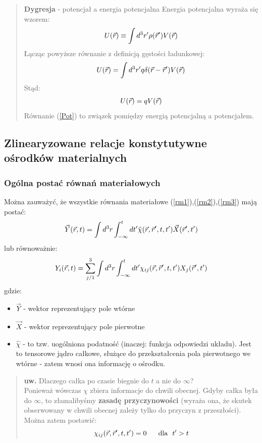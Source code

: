 \begin{enumerate}
\begin{verse}{\textbf{Dygresja} - potencjał a energia potencjalna}
Energia potencjalna wyraża się wzorem:
\begin{equation} U(\vec{r}) \equiv \int d^3r'\rho(\vec{r}')V(\vec{r}) \end{equation}
Łącząc powyższe równanie z definicją gęstości ładunkowej:
\begin{equation} U(\vec{r}) = \int d^3r'q\delta(\vec{r}-\vec{r}')V(\vec{r})\end{equation}
Stąd:
\begin{equation} U(\vec{r}) = qV(\vec{r}) \label{Pot}\end{equation}
Równanie (\ref{Pot}) to związek pomiędzy energią potencjalną a potencjałem.
\end{verse}
\end{enumerate}
\subsection{Zlinearyzowane relacje konstytutywne ośrodków materialnych}
\subsubsection{Ogólna postać równań materiałowych}
Można zauważyć, że wszystkie równania materiałowe (\ref{rm1}),(\ref{rm2}),(\ref{rm3}) mają postać:
\begin{equation} \vec{Y}(\vec{r},t)=\int d^3r \int_{-\infty}^t dt' \hat{\chi}(\vec{r},\vec{r}',t,t') \vec{X}(\vec{r}',t') \end{equation}
lub równoważnie:
\begin{equation} {Y}_i(\vec{r},t)=\sum_{j/1}^3 \int d^3r \int_{-\infty}^t dt' {\chi}_{ij}(\vec{r},\vec{r}',t,t') X_j(\vec{r}',t') \end{equation}
gdzie:\\
\begin{itemize} \item $\vec{Y}$ - wektor reprezentujący pole wtórne
\item $\vec{X}$ - wektor reprezentujący pole pierwotne
\item $\hat{\chi} $ - to tzw. uogólniona podatność (inaczej: funkcja odpowiedzi układu). Jest to tensorowe jądro całkowe, służące do przekształcenia pola pierwotnego we wtórne - zatem wnosi ona informację o ośrodku.
\end{itemize}
\begin{verse}\textbf{uw.}
Dlaczego całka po czasie biegnie do $t$ a nie do $\infty$? \\
Ponieważ wówczas $\chi$ zbiera informacje do chwili obecnej. Gdyby całka była do $\infty$, to złamalibyśmy \textbf{zasadę przyczynowości} (wyraża ona, że skutek obserwowany w chwili obecnej zależy tylko do przyczyn z przeszłości). \\
Można zatem postawić:
\begin{equation}\chi_{ij}(\vec{r},\vec{r}',t,t')=0 \text{ ~~~~dla~ } t'>t\end{equation}
\end{verse}

